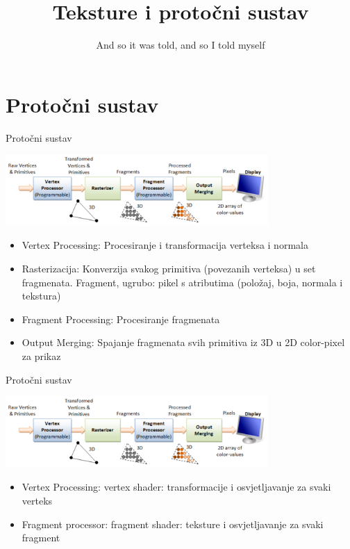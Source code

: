 \documentclass[9pt]{beamer}
\title{Teksture i protočni sustav}
\subtitle {And so it was told, and so I told myself}
\institute{Računalna grafika}
\begin{document}
\begin{frame}
 \titlepage
\end{frame}

\section{Protočni sustav}
\begin{frame}{Protočni sustav}
	\begin{center}
		\includegraphics[width=10cm]{./slike/graphics_pipeline_01.png}
	\end{center}
\begin{itemize}
	\item Vertex Processing: Procesiranje i transformacija verteksa i normala
	\item Rasterizacija: Konverzija svakog primitiva (povezanih verteksa) u set fragmenata. Fragment, ugrubo: pikel s atributima (položaj, boja, normala i tekstura)
	\item Fragment Processing: Procesiranje fragmenata
	\item Output Merging: Spajanje fragmenata svih primitiva iz 3D u 2D color-pixel za prikaz
\end{itemize}
\end{frame}


\begin{frame}{Protočni sustav}
	\begin{center}
		\includegraphics[width=10cm]{./slike/graphics_pipeline_01.png}
	\end{center}
	\begin{itemize}
		\item Vertex Processing: vertex shader: transformacije i osvjetljavanje za svaki verteks
		\item Fragment processor: fragment shader: teksture i osvjetljavanje za svaki fragment
	\end{itemize}
\end{frame}
\end{document}
